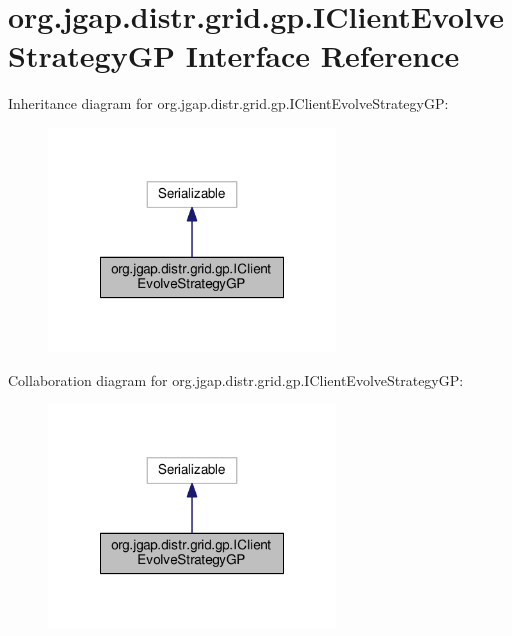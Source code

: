 \hypertarget{interfaceorg_1_1jgap_1_1distr_1_1grid_1_1gp_1_1_i_client_evolve_strategy_g_p}{\section{org.\-jgap.\-distr.\-grid.\-gp.\-I\-Client\-Evolve\-Strategy\-G\-P Interface Reference}
\label{interfaceorg_1_1jgap_1_1distr_1_1grid_1_1gp_1_1_i_client_evolve_strategy_g_p}
}


Inheritance diagram for org.\-jgap.\-distr.\-grid.\-gp.\-I\-Client\-Evolve\-Strategy\-G\-P\-:
\nopagebreak
\begin{figure}[H]
\begin{center}
\leavevmode
\includegraphics[width=216pt]{interfaceorg_1_1jgap_1_1distr_1_1grid_1_1gp_1_1_i_client_evolve_strategy_g_p__inherit__graph}
\end{center}
\end{figure}


Collaboration diagram for org.\-jgap.\-distr.\-grid.\-gp.\-I\-Client\-Evolve\-Strategy\-G\-P\-:
\nopagebreak
\begin{figure}[H]
\begin{center}
\leavevmode
\includegraphics[width=216pt]{interfaceorg_1_1jgap_1_1distr_1_1grid_1_1gp_1_1_i_client_evolve_strategy_g_p__coll__graph}
\end{center}
\end{figure}
